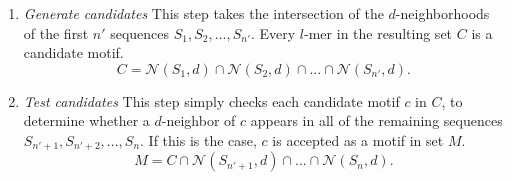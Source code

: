 \documentclass[conference]{IEEEtran}
\begin{document}
		\begin{enumerate}[label={\em (\alph*)}]
			\item {\em Generate candidates}\newline
			This step takes the intersection of the $d$-neighborhoods of the first $n'$ sequences $S_{1},S_{2},...,S_{n'}$. Every $l$-mer in the resulting set $C$ is a candidate motif.\newline
			\begin{equation}
			C = \mathcal{N}(S_{1}, d) \cap \mathcal{N}(S_{2}, d) \cap...\cap \mathcal{N}(S_{n'}, d).
			\end{equation} %
			\item {\em Test candidates}\newline
			This step simply checks each candidate motif $c$ in $C$, to determine whether a $d$-neighbor of $c$ appears in all of the remaining sequences $S_{n'+1},S_{n'+2},...,S_{n}$. If this is the case, $c$ is accepted as a motif in set $M$.\newline
			\begin{equation}
			M = C \cap \mathcal{N}(S_{n'+1}, d) \cap...\cap \mathcal{N}(S_{n}, d).
			\end{equation} %
			\end{enumerate}
		\newpage
\end{document}
